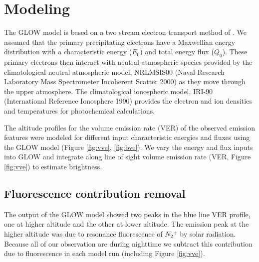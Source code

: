 \section{Modeling} 
\label{sec:model}
The GLOW model is based on a two stream electron transport method of \citet{nagybanks1970}. We assumed that the primary precipitating electrons have a Maxwellian energy distribution with a characteristic energy ($E_{0}$) and total energy flux ($Q_{0}$). These primary electrons then interact with neutral atmospheric species provided by the climatological neutral atmospheric model, NRLMSIS00 (Naval Research Laboratory Mass Spectrometer Incoherent Scatter 2000) \citep{msie} as they move through the upper atmosphere. The climatological ionospheric model, IRI-90 (International Reference Ionosphere 1990) \citep{iri} provides the electron and ion densities and temperatures for photochemical calculations.

 The altitude profiles for the volume emission rate (VER) of the observed emission features were modeled for different input characteristic energies and fluxes using the GLOW model (Figure \ref{fig:vve}, \ref{fig:bve}). 
We vary the energy and flux inputs into GLOW and integrate along line of sight volume emission rate (VER, Figure \ref{fig:vve}) to estimate brightness.
\subsection{Fluorescence contribution removal}
The output of the GLOW model showed two peaks in the blue line VER profile, one at higher altitude and the other at lower altitude. The emission peak at the higher altitude was due to resonance fluorescence of $N{_2}{^+}$ by solar radiation. Because all of our observation are during nighttime we subtract this contribution due to fluorescence in each model run (including Figure \ref{fig:vve}). 



